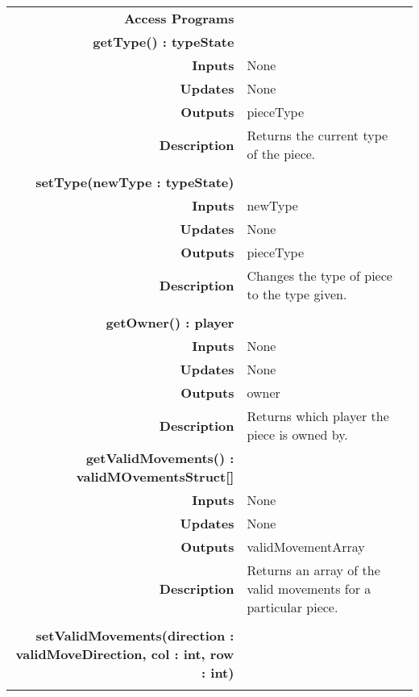 \documentclass[10pt]{article}
\begin{document}
\begin{tabularx}{\linewidth}{ >{\bfseries}r Xp{5cm} }
            Access Programs & \begin{tabular}[t]{@{} l l p{8cm}} 
                                     & \\
                                    \bf{getType()} : typeState & \\
                                    Inputs &  None \\
                                    Updates & None \\
                                    Outputs & pieceType \\
                                    Description & Returns the current type of the piece. \\
                                     & \\
                                    \bf{setType(newType : typeState)} & \\
                                    Inputs & newType \\
                                    Updates & None \\ 
                                    Outputs & pieceType \\
                                    Description & Changes the type of piece to the type given.\\
                                     & \\
                                    \bf{getOwner()} : player & \\
                                    Inputs & None \\
                                    Updates & None \\
                                    Outputs & owner \\ 
                                    Description & Returns which player the piece is owned by.\\
									\bf{getValidMovements()} : validMOvementsStruct[] & \\
                                    Inputs & None \\
                                    Updates & None \\ 
                                    Outputs & validMovementArray \\
                                    Description & Returns an array of the valid movements for a particular piece.\\
                                     & \\
									 \bf{setValidMovements(direction : validMoveDirection, col : int, row : int)} & \\

\end{tabular}
\end{tabularx}
\end{document}
